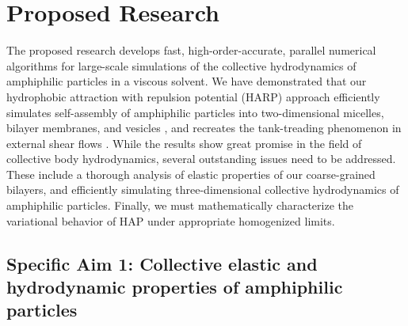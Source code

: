 \newpage

\section{Proposed Research}
\label{sec:proposed-work}
The proposed research develops fast,
high-order-accurate, parallel numerical algorithms for large-scale
simulations of the collective hydrodynamics of amphiphilic particles in a viscous solvent.
%
We have demonstrated that our hydrophobic attraction with repulsion potential (HARP) approach efficiently simulates
self-assembly of amphiphilic particles into two-dimensional micelles, bilayer membranes, and vesicles \cite{Fu19}, and
recreates the tank-treading phenomenon in external shear flows \cite{Fu20}.
%
While the results show great promise in the field of collective body hydrodynamics,
several outstanding issues need to be addressed. These include a thorough 
analysis of elastic properties of our coarse-grained bilayers, and 
efficiently simulating three-dimensional collective hydrodynamics of amphiphilic particles.
Finally, we must mathematically characterize the variational behavior of HAP under appropriate homogenized limits.

\subsection{Specific Aim 1: Collective elastic and hydrodynamic properties of amphiphilic particles}
\label{subsec:specific_aim_1}


